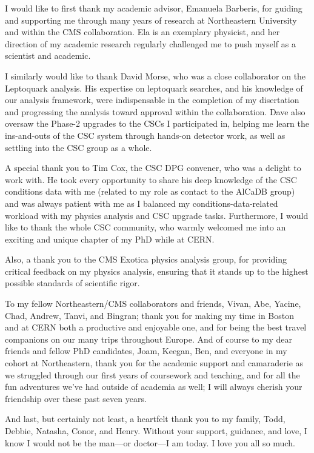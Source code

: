 I would like to first thank my academic advisor, Emanuela Barberis, for guiding and supporting me through many years of research at Northeastern University and within the CMS collaboration. Ela is an exemplary physicist, and her direction of my academic research regularly challenged me to push myself as a scientist and academic.

I similarly would like to thank David Morse, who was a close collaborator on the Leptoquark analysis. His expertise on leptoquark searches, and his knowledge of our analysis framework, were indispensable in the completion of my disertation and progressing the analysis toward approval within the collaboration. Dave also oversaw the Phase-2 upgrades to the CSCs I participated in, helping me learn the ins-and-outs of the CSC system through hands-on detector work, as well as settling into the CSC group as a whole.

A special thank you to Tim Cox, the CSC DPG convener, who was a delight to work with. He took every opportunity to share his deep knowledge of the CSC conditions data with me (related to my role as contact to the AlCaDB group) and was always patient with me as I balanced my conditions-data-related workload with my physics analysis and CSC upgrade tasks. Furthermore, I would like to thank the whole CSC community, who warmly welcomed me into an exciting and unique chapter of my PhD while at CERN.

Also, a thank you to the CMS Exotica physics analysis group, for providing critical feedback on my physics analysis, ensuring that it stands up to the highest possible standards of scientific rigor.

To my fellow Northeastern/CMS collaborators and friends, Vivan, Abe, Yacine, Chad, Andrew, Tanvi, and Bingran; thank you for making my time in Boston and at CERN both a productive and enjoyable one, and for being the best travel companions on our many trips throughout Europe. And of course to my dear friends and fellow PhD candidates, Joam, Keegan, Ben, and everyone in my cohort at Northeastern, thank you for the academic support and camaraderie as we struggled through our first years of coursework and teaching, and for all the fun adventures we've had outside of academia as well; I will always cherish your friendship over these past seven years.

And last, but certainly not least, a heartfelt thank you to my family, Todd, Debbie, Natasha, Conor, and Henry. Without your support, guidance, and love, I know I would not be the man---or doctor---I am today. I love you all so much.